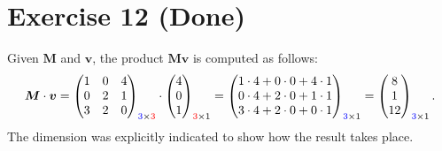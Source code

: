 \documentclass[letterpaper,11pt,twoside]{article}
\begin{document}
\section{Exercise 12 (Done)}
Given $\bm{M}$ and $\bm{v}$, the product $\bm{M}\bm{v}$ is computed as follows:
\begin{align*}
  \bm{M}\cdot\bm{v}=\begin{pmatrix}
    1&0&4\\0&2&1\\3&2&0
  \end{pmatrix}_{\textcolor{blue}{3}\times\textcolor{red}{3}}\cdot\begin{pmatrix}
  4\\0\\1
  \end{pmatrix}_{\textcolor{red}{3}\times1}=\begin{pmatrix}
  1\cdot4+0\cdot0+4\cdot1\\0\cdot4+2\cdot0+1\cdot1\\3\cdot4+2\cdot0+0\cdot1
  \end{pmatrix}_{\textcolor{blue}{3}\times1}=\begin{pmatrix}
  8\\1\\12
  \end{pmatrix}_{\textcolor{blue}{3}\times1}.
\end{align*}
The dimension was explicitly indicated to show how the result takes place.
\end{document}
